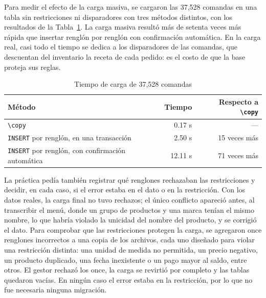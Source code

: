 Para medir el efecto de la carga masiva, se cargaron las 37,528 comandas en una tabla sin restricciones ni disparadores con tres métodos distintos, con los resultados de la Tabla~\ref{tab:tiempos}. La carga masiva resultó más de setenta veces más rápida que insertar renglón por renglón con confirmación automática. En la carga real, casi todo el tiempo se dedica a los disparadores de las comandas, que descuentan del inventario la receta de cada pedido: es el costo de que la base proteja sus reglas.

\begin{table}[H]
    \centering
    \small
    \begin{tabular}{lrr}
        \toprule
        \textbf{Método} & \textbf{Tiempo} & \textbf{Respecto a \texttt{\textbackslash copy}} \\
        \midrule
        \texttt{\textbackslash copy} & 0.17 s & --- \\
        \texttt{INSERT} por renglón, en una transacción & 2.50 s & 15 veces más \\
        \texttt{INSERT} por renglón, con confirmación automática & 12.11 s & 71 veces más \\
        \bottomrule
    \end{tabular}
    \captionsetup{labelfont=bf, textfont=it, labelsep=newline, justification=raggedright, singlelinecheck=false}
    \caption{Tiempo de carga de 37,528 comandas}
    \label{tab:tiempos}
\end{table}

La práctica pedía también registrar qué renglones rechazaban las restricciones y decidir, en cada caso, si el error estaba en el dato o en la restricción. Con los datos reales, la carga final no tuvo rechazos; el único conflicto apareció antes, al transcribir el menú, donde un grupo de productos y una marca tenían el mismo nombre, lo que habría violado la unicidad del nombre del producto, y se corrigió el dato. Para comprobar que las restricciones protegen la carga, se agregaron once renglones incorrectos a una copia de los archivos, cada uno diseñado para violar una restricción distinta: una unidad de medida no permitida, un precio negativo, un producto duplicado, una fecha inexistente o un pago mayor al saldo, entre otros. El gestor rechazó los once, la carga se revirtió por completo y las tablas quedaron vacías. En ningún caso el error estaba en la restricción, por lo que no fue necesaria ninguna migración.
